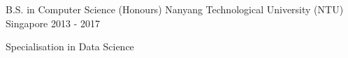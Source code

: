 

\begin{cventries}

  \cventry
    {B.S. in Computer Science (Honours)} %
    {Nanyang Technological University (NTU)} %
    {Singapore} %
    {2013 - 2017} %
    {
      \begin{cvitems} %
        \item {Specialisation in Data Science}
      \end{cvitems}
    }

\end{cventries}
